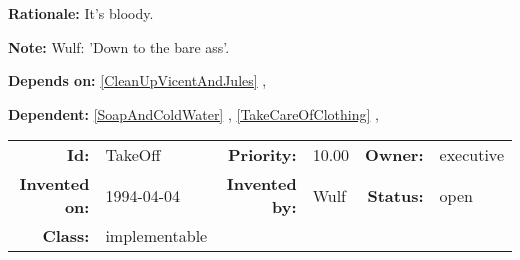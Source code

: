 \textbf{Rationale:} It's bloody.

\textbf{Note:} Wulf: 'Down to the bare ass'.

\textbf{Depends on:} \ref{CleanUpVicentAndJules} , 

\textbf{Dependent:} \ref{SoapAndColdWater} , \ref{TakeCareOfClothing} , 

\par
{\small \begin{center}\begin{tabular}{rlrlrl}
\textbf{Id:} & TakeOff & \textbf{Priority:} & 10.00 & \textbf{Owner:} & executive \\ 
\textbf{Invented on:} & 1994-04-04 & \textbf{Invented by:} & Wulf & \textbf{Status:} & open \\ 
\textbf{Class:} & implementable & & & & \\ 
\end{tabular}\end{center} }